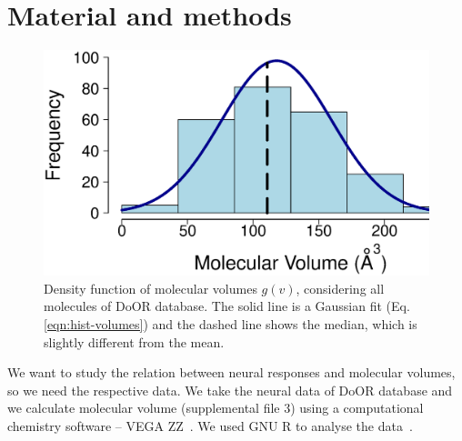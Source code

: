 \documentclass[11pt]{paper} %
\begin{document}

 
 

\section{Material and methods}
\begin{figure}
	\centering
	\includegraphics[width=0.5 \textwidth]{fig/hist-volumes}
	\caption{Density function of molecular volumes $g(v)$, considering all molecules of DoOR database. 
		The solid line is a Gaussian fit (Eq. \ref{eqn:hist-volumes}) and the dashed line shows the median, 
		which is slightly different from  the mean.}
	\label{fig:hist-volumes}
\end{figure}

We want to study the relation between neural responses and molecular volumes, 
so we need the respective data. 
We take the neural data of DoOR database \cite{Galizia2010} and we calculate molecular volume (supplemental file 3) using a computational chemistry software -- VEGA ZZ~\cite{Pedretti2004}. 
We used  GNU R to analyse the data~\cite{Rlanguage}.
\end{document}
